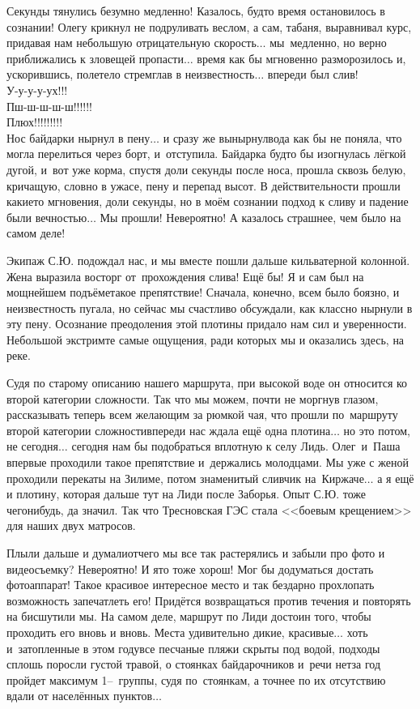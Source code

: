 Секунды тянулись безумно медленно! Казалось, будто время остановилось в сознании! Олегу крикнул не подруливать веслом, а сам, табаня, выравнивал курс, придавая нам небольшую отрицательную скорость$\ldots$ мы~медленно, но верно приближались к зловещей пропасти$\ldots$ время как бы мгновенно разморозилось и, ускорившись, полетело стремглав в неизвестность$\ldots$ впереди был слив!\\
{\large У-у-у-у-ух!!!\\
\hspace*{29mm} \Large Пш-ш-ш-ш-ш!!!!!!\\
\hspace*{80mm} \LARGE Плюх!!!!!!!!!}\\
\noindent Нос байдарки нырнул в пену$\ldots$ и сразу же вынырнул\mdash вода как бы не поняла, что могла перелиться через борт, и~отступила. Байдарка будто бы изогнулась лёгкой дугой, и~вот уже корма, спустя доли секунды после носа, прошла сквозь белую, кричащую, словно в ужасе, пену и перепад высот. В действительности прошли какие\sdash то мгновения, доли секунды, но в моём сознании подход к сливу и падение были вечностью$\ldots$ Мы прошли! Невероятно! А казалось страшнее, чем было на самом деле! 
 
Экипаж С.Ю. подождал нас, и мы вместе пошли дальше кильватерной колонной. Жена выразила восторг от~прохождения слива! Ещё бы! Я и сам был на мощнейшем подъёме\mdash такое препятствие! Сначала, конечно, всем было боязно, и неизвестность пугала, но сейчас мы счастливо обсуждали, как классно нырнули в эту пену. Осознание преодоления этой плотины придало нам сил и уверенности. Небольшой экстрим\mdash те самые ощущения, ради которых мы и оказались здесь, на реке. 

Судя по старому описанию нашего маршрута, при высокой воде он относится ко второй категории сложности. Так что мы можем, почти не моргнув глазом, рассказывать теперь всем желающим за рюмкой чая, что прошли по~маршруту второй категории сложности\mdash впереди нас ждала ещё одна плотина$\ldots$ но это потом, не сегодня$\ldots$ сегодня нам бы подобраться вплотную к селу Лидь. Олег~и~Паша впервые проходили такое препятствие и~держались молодцами. Мы уже с женой проходили перекаты на Зилиме, потом знаменитый сливчик на~Киржаче$\ldots$ а я ещё и плотину, которая дальше тут на Лиди после Заборья. Опыт С.Ю. тоже чего\sdash нибудь, да значил. Так что Тресновская ГЭС стала <<боевым крещением>> для наших двух матросов.

Плыли дальше и думали\mdash отчего мы все так растерялись и забыли про фото и видеосъемку? Невероятно! И я\sdash то тоже хорош! Мог бы додуматься достать фотоаппарат! Такое красивое интересное место и так бездарно прохлопать возможность запечатлеть его! Придётся возвращаться против течения и повторять на бис\mdash шутили мы. На самом деле, маршрут по Лиди достоин того, чтобы проходить его вновь и вновь. Места удивительно дикие, красивые$\ldots$ хоть и~затопленные в этом году\mdash все песчаные пляжи скрыты под водой, подходы сплошь поросли густой травой, о стоянках байдарочников и~речи нет\mdash за год пройдет максимум 1\thinspace\nobreakdash--~группы, судя по~стоянкам, а точнее по их отсутствию вдали от населённых пунктов$\ldots$

